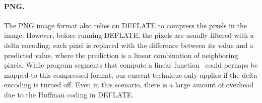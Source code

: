 \paragraph{PNG.}
The PNG image format also relies on DEFLATE to compress the pixels in
the image.  However, before running DEFLATE, the pixels are usually
filtered with a delta encoding; each pixel is replaced with the
difference between its value and a predicted value, where the
prediction is a linear combination of neighboring pixels.  While
program segments that compute a linear function~\cite{aalamb} could
perhaps be mapped to this compressed format, our current technique
only applies if the delta encoding is turned off.  Even in this
scenario, there is a large amount of overhead due to the Huffman
coding in DEFLATE.
